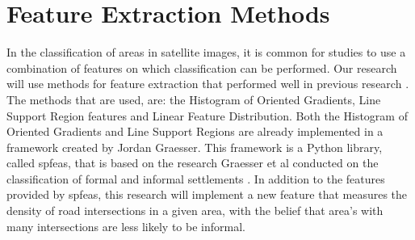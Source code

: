 \section{Feature Extraction Methods}

In the classification of areas in satellite images, it is common for studies to use
a combination of features on which classification can be performed.
Our research will use methods for feature extraction that performed well in
previous research \cite{graesser2012image}. The methods that are used, are: the Histogram
of Oriented Gradients, Line Support Region features and Linear Feature
Distribution. Both the Histogram of Oriented Gradients and Line Support Regions
are already implemented in a framework created by Jordan Graesser. This
framework is a Python library, called spfeas, that is based on the
research Graesser et al conducted on the classification of formal and informal
settlements \cite{graesser2012image}. In addition to the features provided by
spfeas, this research will implement a new feature that measures the density of
road intersections in a given area, with the belief that area's with many
intersections are less likely to be informal.









